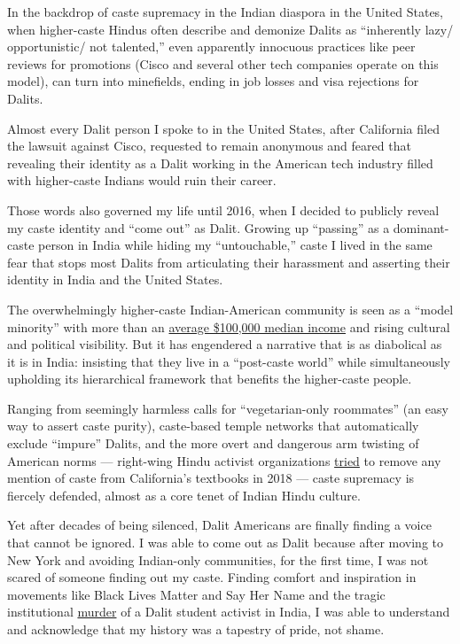 In the backdrop of caste supremacy in the Indian diaspora in the United
States, when higher-caste Hindus often describe and demonize Dalits as
``inherently lazy/ opportunistic/ not talented,'' even apparently
innocuous practices like peer reviews for promotions (Cisco and several
other tech companies operate on this model), can turn into minefields,
ending in job losses and visa rejections for Dalits.

Almost every Dalit person I spoke to in the United States, after
California filed the lawsuit against Cisco, requested to remain
anonymous and feared that revealing their identity as a Dalit working in
the American tech industry filled with higher-caste Indians would ruin
their career.

Those words also governed my life until 2016, when I decided to publicly
reveal my caste identity and ``come out'' as Dalit. Growing up
``passing'' as a dominant-caste person in India while hiding my
``untouchable,'' caste I lived in the same fear that stops most Dalits
from articulating their harassment and asserting their identity in India
and the United States.

The overwhelmingly higher-caste Indian-American community is seen as a
``model minority'' with more than an
\href{https://www8.gsb.columbia.edu/articles/chazen-global-insights/singular-population-indian-immigrants-america}{average
\$100,000 median income} and rising cultural and political visibility.
But it has engendered a narrative that is as diabolical as it is in
India: insisting that they live in a ``post-caste world'' while
simultaneously upholding its hierarchical framework that benefits the
higher-caste people.

Ranging from seemingly harmless calls for ``vegetarian-only roommates''
(an easy way to assert caste purity), caste-based temple networks that
automatically exclude ``impure'' Dalits, and the more overt and
dangerous arm twisting of American norms --- right-wing Hindu activist
organizations
\href{https://www.nytimes.com/2016/05/06/us/debate-erupts-over-californias-india-history-curriculum.html}{tried}
to remove any mention of caste from California's textbooks in 2018 ---
caste supremacy is fiercely defended, almost as a core tenet of Indian
Hindu culture.

Yet after decades of being silenced, Dalit Americans are finally finding
a voice that cannot be ignored. I was able to come out as Dalit because
after moving to New York and avoiding Indian-only communities, for the
first time, I was not scared of someone finding out my caste. Finding
comfort and inspiration in movements like Black Lives Matter and Say Her
Name and the tragic institutional
\href{https://www.theguardian.com/global-development/2020/feb/19/coming-out-as-dalit-how-one-indian-author-finally-embraced-her-identity}{murder}
of a Dalit student activist in India, I was able to understand and
acknowledge that my history was a tapestry of pride, not shame.

